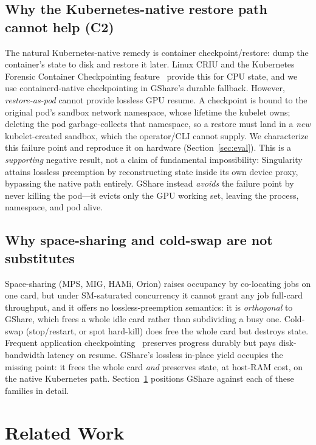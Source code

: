 \documentclass[preprint,12pt]{elsarticle}
\begin{document}
\subsection{Why the Kubernetes-native restore path cannot help (C2)}
\label{sec:c2}
The natural Kubernetes-native remedy is container checkpoint/restore: dump the container's state to disk
and restore it later. Linux CRIU and the Kubernetes Forensic Container Checkpointing
feature~\cite{kep2008} provide this for CPU state, and we use containerd-native checkpointing in GShare's
durable fallback. However, \emph{restore-as-pod} cannot provide lossless GPU resume. A checkpoint is bound
to the original pod's sandbox network namespace, whose lifetime the kubelet owns; deleting the pod
garbage-collects that namespace, so a restore must land in a \emph{new} kubelet-created sandbox, which the
operator/CLI cannot supply. We characterize this failure point and reproduce it on hardware
(Section~\ref{sec:eval}). This is a \emph{supporting} negative result, not a claim of fundamental
impossibility: Singularity attains lossless preemption by reconstructing state inside its own device
proxy, bypassing the native path entirely. GShare instead \emph{avoids} the failure point by never killing
the pod---it evicts only the GPU working set, leaving the process, namespace, and pod alive.

\subsection{Why space-sharing and cold-swap are not substitutes}
Space-sharing (MPS, MIG, HAMi, Orion) raises occupancy by co-locating jobs on one card, but under
SM-saturated concurrency it cannot grant any job full-card throughput, and it offers no lossless-preemption
semantics: it is \emph{orthogonal} to GShare, which frees a whole idle card rather than subdividing a busy
one. Cold-swap (stop/restart, or spot hard-kill) does free the whole card but destroys state. Frequent
application checkpointing~\cite{checkfreq,checknrun} preserves progress durably but pays disk-bandwidth
latency on resume. GShare's lossless in-place yield occupies the missing point: it frees the whole card
\emph{and} preserves state, at host-RAM cost, on the native Kubernetes path. Section~\ref{sec:related}
positions GShare against each of these families in detail.

\section{Related Work}
\label{sec:related}
\end{document}
